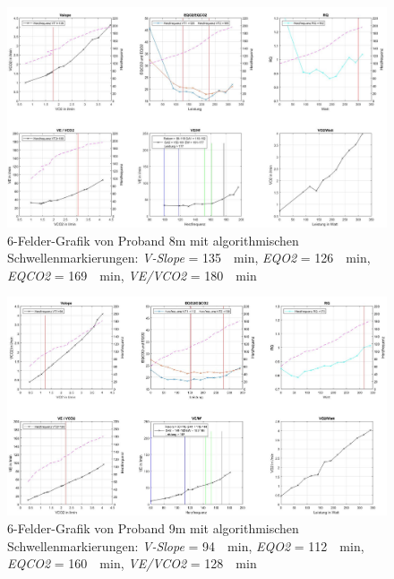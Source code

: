 \begin{figure}[H]
	\centering
	\noindent\includegraphics[angle=0,width=\linewidth,keepaspectratio]{Bilder/auto_8}
	\caption[6-Felder-Grafik von Proband 8m mit algorithmischen Schwellenmarkierungen]{6-Felder-Grafik von Proband 8m mit algorithmischen Schwellenmarkierungen: \textsl{V-Slope} = \SI{135}{\per\minute}, \textsl{\acs{EQO2}} = \SI{126}{\per\minute}, \textsl{\acs{EQCO2}} = \SI{169}{\per\minute}, \textsl{\acs{VE}/\acs{VCO2}} = \SI{180}{\per\minute}}
	\label{pic:pic18}
\end{figure}
%
\begin{figure}[H]
	\centering
	\noindent\includegraphics[angle=0,width=\linewidth,keepaspectratio]{Bilder/auto_9}
	\caption[6-Felder-Grafik von Proband 9m mit algorithmischen Schwellenmarkierungen]{6-Felder-Grafik von Proband 9m mit algorithmischen Schwellenmarkierungen: \textsl{V-Slope} = \SI{94}{\per\minute}, \textsl{\acs{EQO2}} = \SI{112}{\per\minute}, \textsl{\acs{EQCO2}} = \SI{160}{\per\minute}, \textsl{\acs{VE}/\acs{VCO2}} = \SI{128}{\per\minute}}
	\label{pic:pic19}
\end{figure}
